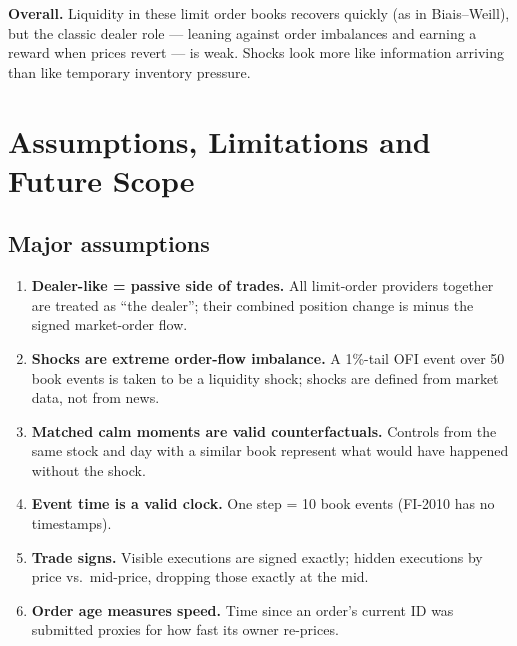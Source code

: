 \documentclass[11pt,a4paper]{article}
\begin{document}
\noindent\textbf{Overall.} Liquidity in these limit order books recovers quickly (as in Biais--Weill), but the
classic dealer role --- leaning against order imbalances and earning a reward when prices revert --- is weak.
Shocks look more like information arriving than like temporary inventory pressure.

\section{Assumptions, Limitations and Future Scope}
\label{sec:limits}

\subsection{Major assumptions}
\begin{enumerate}
\item \textbf{Dealer-like = passive side of trades.} All limit-order providers together are treated as
      ``the dealer''; their combined position change is minus the signed market-order flow.
\item \textbf{Shocks are extreme order-flow imbalance.} A 1\%-tail OFI event over 50 book events is taken to be
      a liquidity shock; shocks are defined from market data, not from news.
\item \textbf{Matched calm moments are valid counterfactuals.} Controls from the same stock and day with a
      similar book represent what would have happened without the shock.
\item \textbf{Event time is a valid clock.} One step = 10 book events (FI-2010 has no timestamps).
\item \textbf{Trade signs.} Visible executions are signed exactly; hidden executions by price vs.\ mid-price,
      dropping those exactly at the mid.
\item \textbf{Order age measures speed.} Time since an order's current ID was submitted proxies for how fast
      its owner re-prices.
\end{enumerate}
\end{document}
